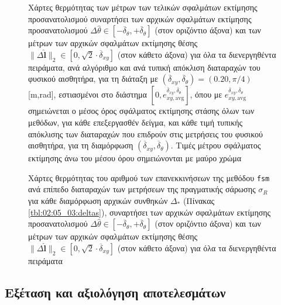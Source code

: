 \begin{figure}\vspace{1cm}\hspace{0.5cm}
  
  \vspace{1cm}
  \caption{\small Χάρτες θερμότητας των μέτρων των τελικών σφαλμάτων εκτίμησης
           προσανατολισμού συναρτήσει των αρχικών σφαλμάτων εκτίμησης
           προσανατολισμού $\Delta\hat{\theta} \in
           [-\overline{\delta}_{\theta},+\overline{\delta}_{\theta}]$ (στον
           οριζόντιο άξονα) και των μέτρων των αρχικών σφαλμάτων εκτίμησης
           θέσης $\|\Delta \hat{\bm{l}}\|_2 \in [0, \sqrt{2}\cdot
           \overline{\delta}_{xy}]$ (στον κάθετο άξονα) για όλα τα
           διενεργηθέντα πειράματα, ανά αλγόριθμο και ανά τυπική απόκλιση
           διαταραχών του φυσικού αισθητήρα, για τη διάταξη με
           $(\overline{\delta}_{xy}, \overline{\delta}_{\theta}) = (0.20,
           \pi/4)$ [m,rad], εστιασμένοι στο διάστημα $[0,
           e_{xy,\text{avg}}^{\overline{\delta}_{xy},
           \overline{\delta}_{\theta}}]$, όπου με
           $e_{xy,\text{avg}}^{\overline{\delta}_{xy},
           \overline{\delta}_{\theta}}$ σημειώνεται ο μέσος όρος σφάλματος
           εκτίμησης στάσης όλων των μεθόδων, για κάθε επεξεργασθέν δείγμα, και
           κάθε τιμή τυπικής απόκλισης των διαταραχών που επιδρούν στις
           μετρήσεις του φυσικού αισθητήρα, για τη διαμόρφωση
           $(\overline{\delta}_{xy}, \overline{\delta}_{\theta})$.  Τιμές
           μέτρου σφάλματος εκτίμησης άνω του μέσου όρου σημειώνονται με μαύρο
           χρώμα}
  \label{fig:02_05_03:02:07}
\end{figure}

\begin{figure}\vspace{1cm}\hspace{0.5cm}
  
  \vspace{1cm}
  \caption{\small Χάρτες θερμότητας του αριθμού των επανεκκινήσεων της μεθόδου
           \texttt{fsm} ανά επίπεδο διαταραχών των μετρήσεων της πραγματικής
           σάρωσης $\sigma_R$ για κάθε διαμόρφωση αρχικών συνθηκών
           $\Delta_\ast$ (Πίνακας \ref{tbl:02:05_03:deltas}), συναρτήσει των
           αρχικών σφαλμάτων εκτίμησης προσανατολισμού $\Delta\hat{\theta} \in
           [-\overline{\delta}_{\theta},+\overline{\delta}_{\theta}]$ (στον
           οριζόντιο άξονα) και των μέτρων των αρχικών σφαλμάτων εκτίμησης
           θέσης $\|\Delta \hat{\bm{l}}\|_2 \in [0, \sqrt{2}\cdot
           \overline{\delta}_{xy}]$ (στον κάθετο άξονα) για όλα τα
           διενεργηθέντα πειράματα}
  \label{fig:02_05_03:02:08}
\end{figure}

\subsection{Εξέταση και αξιολόγηση αποτελεσμάτων}
\label{subsection:02_05_03:03}


